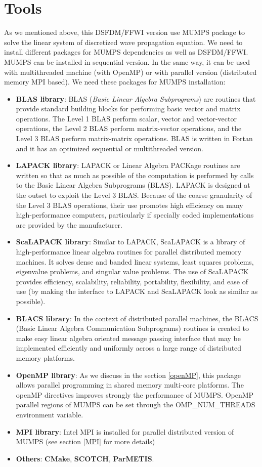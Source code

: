 \section{Tools}
As we mentioned above, this DSFDM/FFWI version use MUMPS package to solve the linear system of discretized wave propagation equation. We need to install different packages for MUMPS dependencies as well as DSFDM/FFWI. MUMPS can be installed in sequential version. In the same way, it can be used with multithreaded machine (with OpenMP) or with parallel version (distributed memory MPI based). We need these packages for MUMPS installation:
\begin{itemize}
\item \textbf{BLAS library}: BLAS (\textit{Basic Linear Algebra Subprograms}) are routines that provide standard building blocks for performing basic vector and matrix operations. The Level 1 BLAS perform scalar, vector and vector-vector operations, the Level 2 BLAS perform matrix-vector operations, and the Level 3 BLAS perform matrix-matrix operations. BLAS is written in Fortan and it has an optimized sequential or multithreaded version.
\item \textbf{LAPACK library}: LAPACK or Linear Algebra PACKage routines are written so that as much as possible of the computation is performed by calls to the Basic Linear Algebra Subprograms (BLAS). LAPACK is designed at the outset to exploit the Level 3 BLAS. Because of the coarse granularity of the Level 3 BLAS operations, their use promotes high efficiency on many high-performance computers, particularly if specially coded implementations are provided by the manufacturer.
\item \textbf{ScaLAPACK library}: Similar to LAPACK, ScaLAPACK is a library of high-performance linear algebra routines for parallel distributed memory machines. It solves dense and banded linear systems, least squares problems, eigenvalue problems, and singular value problems. The use of ScaLAPACK provides efficiency, scalability, reliability, portability, flexibility, and ease of use (by making the interface to LAPACK and ScaLAPACK look as similar as possible). 
\item \textbf{BLACS library}: In the context of distributed parallel machines, the BLACS (Basic Linear Algebra Communication Subprograms) routines is created to make easy linear algebra oriented message passing interface that may be implemented efficiently and uniformly across a large range of distributed memory platforms.
\item \textbf{OpenMP library}: As we discuss in the section \ref{openMP}, this package allows parallel programming in  shared memory multi-core platforms. The openMP directives improves strongly the performance of MUMPS. OpenMP parallel regions of MUMPS can be set through the OMP\_NUM\_THREADS environment variable. 
\item \textbf{MPI library}: Intel MPI is installed for parallel distributed version of MUMPS (see section \ref{MPI} for more details)
\item \textbf{Others}: \textbf{CMake}, \textbf{SCOTCH}, \textbf{ParMETIS}.
\end{itemize}

